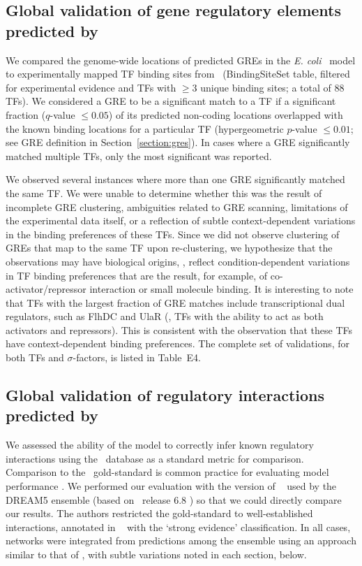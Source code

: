 \subsection{Global validation of gene regulatory elements predicted by \egrine}
\label{section:tfbs:vs:regdb}

We compared the genome-wide locations of predicted GREs in the {\it
  E. coli} \egrine~model to experimentally mapped TF binding sites
from \rdb~(BindingSiteSet table, filtered for experimental evidence
and TFs with $\geq 3$ unique binding sites; a total of 88 TFs). We
considered a GRE to be a significant match to a TF if a significant
fraction ($q$-value $\leq 0.05$) of its predicted non-coding locations
overlapped with the known binding locations for a particular TF
(hypergeometric $p$-value $\leq 0.01$; see GRE definition in
Section~\ref{section:gres}). In cases where a GRE significantly
matched multiple TFs, only the most significant was reported.

We observed several instances where more than one GRE significantly
matched the same TF. We were unable to determine whether this was the
result of incomplete GRE clustering, ambiguities related to GRE
scanning, limitations of the experimental data itself, or a reflection
of subtle context-dependent variations in the binding preferences of
these TFs. Since we did not observe clustering of GREs that map to the
same TF upon re-clustering, we hypothesize that the observations may
have biological origins, \ie, reflect condition-dependent variations
in TF binding preferences that are the result, for example, of
co-activator/repressor interaction or small molecule binding. It is
interesting to note that TFs with the largest fraction of GRE matches
include transcriptional dual regulators, such as FlhDC and UlaR (\ie,
TFs with the ability to act as both activators and repressors). This
is consistent with the observation that these TFs have
context-dependent binding preferences. The complete set of
validations, for both TFs and $\sigma$-factors, is listed in Table~E4.

\subsection{Global validation of regulatory interactions predicted by \egrine}
\label{section:aupr:vs:regdb}

We assessed the ability of the \egrine model to correctly infer known
regulatory interactions using the \rdb~database as a standard metric
for comparison. Comparison to the \rdb~gold-standard is common
practice for evaluating model performance \cite{Marbach2012}. We
performed our evaluation with the version of \rdb~ used by the DREAM5
ensemble (based on \rdb\ release 6.8 \cite{Marbach2012}) so that we
could directly compare our results. The authors \cite{Marbach2012}
restricted the gold-standard to well-established interactions,
annotated in \rdb~ with the `strong evidence' classification. In all
cases, networks were integrated from predictions among the ensemble
using an approach similar to that of \cite{Marbach2012}, with subtle
variations noted in each section, below.

